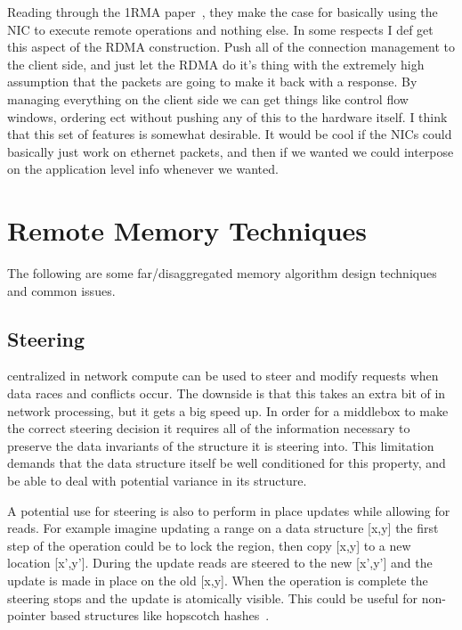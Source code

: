 Reading through the 1RMA paper~\cite{1rma}, they make the case for basically
using the NIC to execute remote operations and nothing else. In some respects I
def get this aspect of the RDMA construction. Push all of the connection
management to the client side, and just let the RDMA do it's thing with the
extremely high assumption that the packets are going to make it back with a
response. By managing everything on the client side we can get things like
control flow windows, ordering ect without pushing any of this to the hardware
itself. I think that this set of features is somewhat desirable. It would be
cool if the NICs could basically just work on ethernet packets, and then if we
wanted we could interpose on the application level info whenever we wanted.


\section{Remote Memory Techniques}
\label{sec:techniques}

The following are some far/disaggregated memory algorithm design techniques and
common issues.

\subsection{Steering} 
\label{sec:steering}
%
centralized in network compute can be used to steer and modify
requests when data races and conflicts occur. The downside is that this takes an
extra bit of in network processing, but it gets a big speed up. In order for a
middlebox to make the correct steering decision it requires all of the
information necessary to preserve the data invariants of the structure it is
steering into. This limitation demands that the data structure itself be well
conditioned for this property, and be able to deal with potential variance in
its structure.

A potential use for steering is also to perform in place updates while allowing
for reads. For example imagine updating a range on a data structure [x,y] the
first step of the operation could be to lock the region, then copy [x,y] to a
new location [x',y']. During the update reads are steered to the new [x',y'] and
the update is made in place on the old [x,y]. When the operation is complete the
steering stops and the update is atomically visible. This could be useful for
non-pointer based structures like hopscotch hashes~\cite{hopscotch}.

